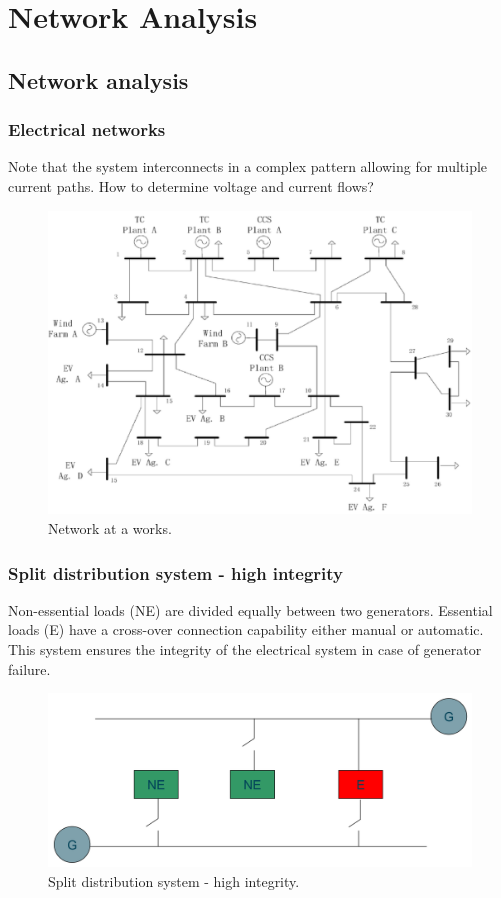\chapter{Network Analysis}
\section{Network analysis}
\subsection{Electrical networks}
Note that the system interconnects in a complex pattern allowing for multiple current paths. How to determine voltage and current flows?
\begin{figure}[H]
	\centering
	\includegraphics[width = \textwidth]{./img/figure45.png}
	\caption{Network at a works.}
\end{figure}
\subsection{Split distribution system - high integrity}
Non-essential loads (NE) are divided equally between two generators. Essential loads (E) have a cross-over connection capability either manual or automatic. This system ensures the integrity of the electrical system in case of generator failure.
\begin{figure}[H]
	\centering
	\includegraphics[width = \textwidth]{./img/figure46.png}
	\caption{Split distribution system - high integrity.}
\end{figure}
